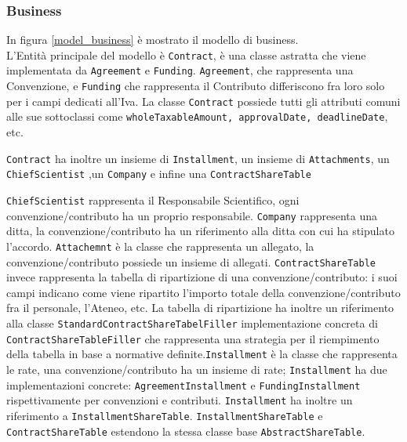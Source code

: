 \subsubsection{Business}

In figura \ref{model_business} è mostrato il modello di business. \\

L'Entità principale del modello è \texttt{Contract}, è una classe astratta che viene implementata da \texttt{Agreement} e \texttt{Funding}.
\texttt{Agreement}, che rappresenta una Convenzione, e \texttt{Funding} che rappresenta il Contributo differiscono fra loro solo per i campi dedicati all'Iva. La classe \texttt{Contract} possiede
tutti gli attributi comuni alle sue sottoclassi come \texttt{wholeTaxableAmount, approvalDate, deadlineDate}, etc.


\texttt{Contract} ha inoltre un insieme di \texttt{Installment}, un insieme di \texttt{Attachments}, un \texttt{ChiefScientist}
,un \texttt{Company} e infine una \texttt{ContractShareTable}

\texttt{ChiefScientist} rappresenta il Responsabile Scientifico, ogni convenzione/contributo ha un proprio responsabile.
\texttt{Company} rappresenta una ditta, la convenzione/contributo ha un riferimento alla ditta con cui ha stipulato l'accordo.
\texttt{Attachemnt} è la classe che rappresenta un allegato, la convenzione/contributo possiede un insieme di allegati.
\texttt{ContractShareTable} invece rappresenta la tabella di ripartizione di una convenzione/contributo: i suoi campi indicano come viene ripartito l'importo totale della convenzione/contributo fra il personale, l'Ateneo, etc.
La tabella di ripartizione ha inoltre un riferimento alla classe \texttt{StandardContractShareTabelFiller} implementazione concreta di \texttt{ContractShareTableFiller} che rappresenta una strategia per il riempimento della tabella in base
a normative definite.\texttt{Installment} è la classe che rappresenta le rate, una convenzione/contributo ha un insieme di rate; \texttt{Installment} ha due implementazioni concrete: \texttt{AgreementInstallment} e \texttt{FundingInstallment} rispettivamente
per convenzioni e contributi. \texttt{Installment} ha inoltre un riferimento a \texttt{InstallmentShareTable}. \texttt{InstallmentShareTable} e \texttt{ContractShareTable} estendono la stessa classe base \texttt{AbstractShareTable}.




